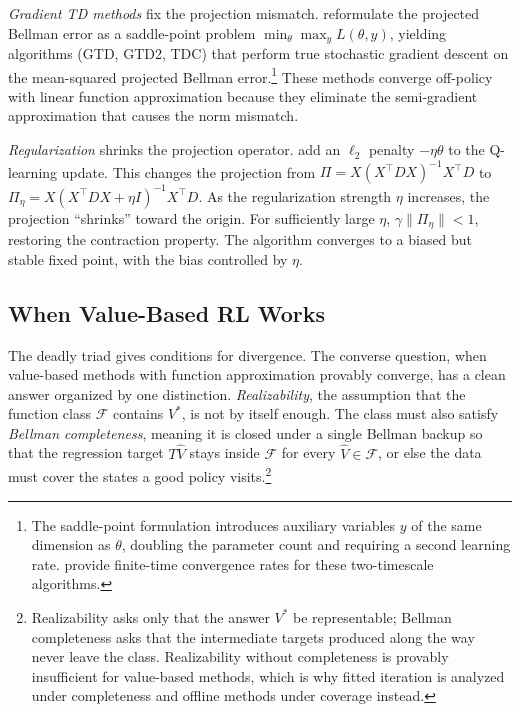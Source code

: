 \emph{Gradient TD methods} fix the projection mismatch. \citet{sutton2009gtd} reformulate the projected Bellman error as a saddle-point problem $\min_\theta \max_y L(\theta, y)$, yielding algorithms (GTD, GTD2, TDC) that perform true stochastic gradient descent on the mean-squared projected Bellman error.\footnote{The saddle-point formulation introduces auxiliary variables $y$ of the same dimension as $\theta$, doubling the parameter count and requiring a second learning rate. \citet{bhandari2021finite} provide finite-time convergence rates for these two-timescale algorithms.} These methods converge off-policy with linear function approximation because they eliminate the semi-gradient approximation that causes the norm mismatch.

\emph{Regularization} shrinks the projection operator. \citet{lim2024regularized} add an $\ell_2$ penalty $-\eta\theta$ to the Q-learning update. This changes the projection from $\Pi = X(X^\top D X)^{-1} X^\top D$ to $\Pi_\eta = X(X^\top D X + \eta I)^{-1} X^\top D$. As the regularization strength $\eta$ increases, the projection ``shrinks'' toward the origin. For sufficiently large $\eta$, $\gamma\|\Pi_\eta\| < 1$, restoring the contraction property. The algorithm converges to a biased but stable fixed point, with the bias controlled by $\eta$.

\subsection{When Value-Based RL Works}
\label{sec:when_value_works}

The deadly triad gives conditions for divergence. The converse question, when value-based methods with function approximation provably converge, has a clean answer organized by one distinction. \emph{Realizability}, the assumption that the function class $\mathcal{F}$ contains $V^*$, is not by itself enough. The class must also satisfy \emph{Bellman completeness}, meaning it is closed under a single Bellman backup so that the regression target $T\hat{V}$ stays inside $\mathcal{F}$ for every $\hat{V} \in \mathcal{F}$, or else the data must cover the states a good policy visits.\footnote{Realizability asks only that the answer $V^*$ be representable; Bellman completeness asks that the intermediate targets produced along the way never leave the class. Realizability without completeness is provably insufficient for value-based methods, which is why fitted iteration is analyzed under completeness and offline methods under coverage instead.}

